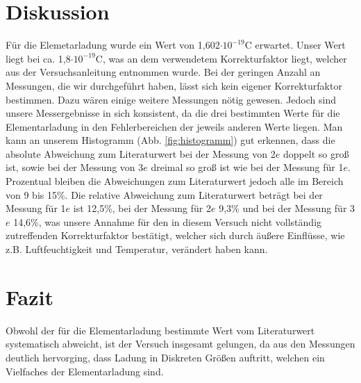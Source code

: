 \documentclass[12pt]{scrartcl}
\begin{document}
\section{Diskussion}
Für die Elemetarladung wurde ein Wert von 1,602$\cdot 10^{-19}$C erwartet. Unser Wert liegt bei ca. 1,8$\cdot 10^{-19}$C, was an dem verwendetem Korrekturfaktor liegt, welcher aus der Versuchsanleitung entnommen wurde. Bei der geringen Anzahl an Messungen, die wir durchgeführt haben, lässt sich kein eigener Korrekturfaktor bestimmen. Dazu wären einige weitere Messungen nötig gewesen. Jedoch sind unsere Messergebnisse in sich konsistent, da die drei bestimmten Werte für die Elementarladung in den Fehlerbereichen der jeweils anderen Werte liegen. Man kann an unserem Histogramm (Abb. \ref{fig:histogramm}) gut erkennen, dass die absolute Abweichung zum Literaturwert bei der Messung von 2$e$ doppelt so groß ist, sowie bei der Messung von 3$e$ dreimal so groß ist wie bei der Messung für 1$e$. Prozentual bleiben die Abweichungen zum Literaturwert jedoch alle im Bereich von 9 bis 15\%. Die relative Abweichung zum Literaturwert beträgt bei der Messung für 1$e$ ist 12,5\%, bei der Messung für 2$e$ 9,3\% und bei der Messung für 3$e$ 14,6\%, was unsere Annahme für den in diesem Versuch nicht vollständig zutreffenden Korrekturfaktor bestätigt, welcher sich durch äußere Einflüsse, wie z.B. Luftfeuchtigkeit und Temperatur, verändert haben kann.   

\section{Fazit}
Obwohl der für die Elementarladung bestimmte Wert vom Literaturwert systematisch abweicht, ist der Versuch insgesamt gelungen, da aus den Messungen deutlich hervorging, dass Ladung in Diskreten Größen auftritt, welchen ein Vielfaches der Elementarladung sind.
\end{document}
